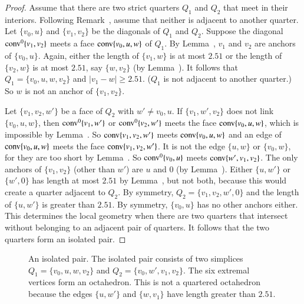 \begin{proof}  Assume that there are two strict quarters $Q_1$ and $Q_2$
that meet in their interiors.  Following Remark~,
assume that neither is adjacent to another quarter. Let $\{v_0,u\}$
and $\{v_1,v_2\}$ be the diagonals of $Q_1$ and $Q_2$. Suppose the
diagonal ${\operatorname{conv}}^0\{v_1,v_2\}$ meets a face ${\operatorname{conv}}\{v_0,u,w\}$ of $Q_1$.
By Lemma~, $v_1$ and $v_2$ are anchors of
$\{v_0,u\}$. Again, either the length of $\{v_1,w\}$ is at most
$2.51$ or the length of $\{v_2,w\}$ is at most $2.51$, say
$\{w,v_2\}$ (by Lemma~). It follows
that
    $Q_1=\{v_0,u,w,v_2\}$ and $|v_1-w|\ge2.51$.
($Q_1$ is not adjacent to another quarter.)  So $w$ is not an
anchor of $\{v_1,v_2\}$.

Let $\{v_1,v_2,w'\}$ be a face of $Q_2$ with $w'\ne v_0,u$. If
$\{v_1,w',v_2\}$ does not link $\{v_0,u,w\}$, then ${\operatorname{conv}}^0\{v_1,w'\}$ or
${\operatorname{conv}}^0\{v_2,w'\}$ meets the face ${\operatorname{conv}}\{v_0,u,w\}$, which is
impossible by Lemma~. So
${\operatorname{conv}}\{v_1,v_2,w'\}$  meets ${\operatorname{conv}}\{v_0,u,w\}$
and an edge of ${\operatorname{conv}}\{v_0,u,w\}$
meets the face ${\operatorname{conv}}\{v_1,v_2,w'\}$. It is not the edge
$\{u,w\}$ or $\{v_0,w\}$, for they are too short by
Lemma~.  So ${\operatorname{conv}}^0\{v_0,u\}$ meets 
${\operatorname{conv}}\{w',v_1,v_2\}$. The only anchors of $\{v_1,v_2\}$ (other
than $w'$) are $u$ and $0$ (by Lemma~).
Either $\{u,w'\}$ or $\{w',0\}$ has length at most $2.51$ by
Lemma~, but not both, because this
would create a quarter adjacent to $Q_2$. By symmetry,
$Q_2=\{v_1,v_2,w',0\}$ and the length of $\{u,w'\}$ is greater
than $2.51$. By symmetry, $\{v_0,u\}$ has no other anchors either.
This determines the local geometry when there are two quarters
that intersect without belonging to an adjacent pair of quarters.
It follows that the two quarters form an isolated pair.
\end{proof}

\begin{figure}[htb]
  \centering
  \caption{An isolated pair.  The isolated pair consists of two simplices
   $Q_1=\{v_0,u,w,v_2\}$ and $Q_2=\{v_0,w',v_1,v_2\}$.  The six extremal vertices
   form an octahedron. This is not a quartered octahedron because the edges
   $\{u,w'\}$ and $\{w,v_1\}$ have length greater than $2.51$.}
\end{figure}


